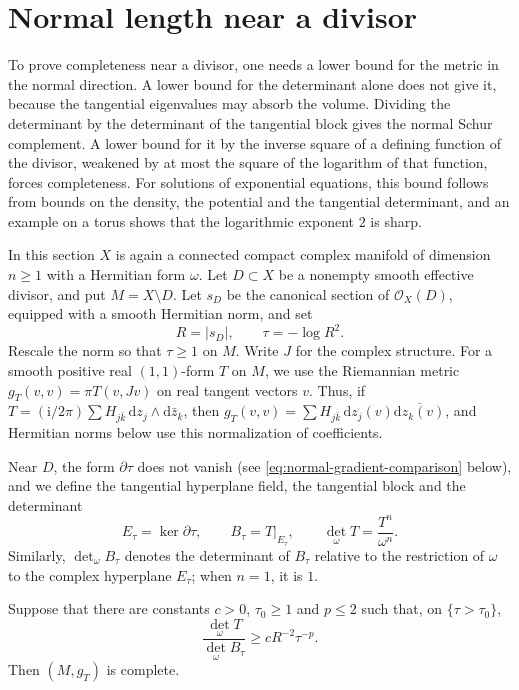 \section{Normal length near a divisor}
\label{sec:divisorial-normal-length}

To prove completeness near a divisor, one needs a lower bound for the metric in the normal direction. A lower bound for the determinant alone does not give it, because the tangential eigenvalues may absorb the volume. Dividing the determinant by the determinant of the tangential block gives the normal Schur complement. A lower bound for it by the inverse square of a defining function of the divisor, weakened by at most the square of the logarithm of that function, forces completeness. For solutions of exponential equations, this bound follows from bounds on the density, the potential and the tangential determinant, and an example on a torus shows that the logarithmic exponent $2$ is sharp.

In this section $X$ is again a connected compact complex manifold of dimension $n\geq1$ with a Hermitian form $\omega$. Let $D\subset X$ be a nonempty smooth effective divisor, and put $M=X\setminus D$. Let $s_D$ be the canonical section of $\mathcal O_X(D)$, equipped with a smooth Hermitian norm, and set
\[
 R=|s_D|,\qquad \tau=-\log R^2.
\]
Rescale the norm so that $\tau\geq1$ on $M$. Write $J$ for the complex structure. For a smooth positive real $(1,1)$-form $T$ on $M$, we use the Riemannian metric $g_T(v,v)=\pi T(v,Jv)$ on real tangent vectors $v$. Thus, if $T=(\mathrm{i}/2\pi)\sum H_{j\bar k}\,\mathrm{d}z_j\wedge\mathrm{d}\bar z_k$, then $g_T(v,v)=\sum H_{j\bar k}\,\mathrm{d}z_j(v)\overline{\mathrm{d}z_k(v)}$, and Hermitian norms below use this normalization of coefficients.

Near $D$, the form $\partial\tau$ does not vanish (see \eqref{eq:normal-gradient-comparison} below), and we define the tangential hyperplane field, the tangential block and the determinant
\[
 E_\tau=\ker\partial\tau,\qquad B_\tau=T|_{E_\tau},\qquad
 \det_\omega T=\frac{T^n}{\omega^n}.
\]
Similarly, $\det_\omega B_\tau$ denotes the determinant of $B_\tau$ relative to the restriction of $\omega$ to the complex hyperplane $E_\tau$; when $n=1$, it is $1$.

\begin{proposition}\label{prop:divisorial-normal-length}
Suppose that there are constants $c>0$, $\tau_0\geq1$ and $p\leq2$ such that, on $\{\tau>\tau_0\}$,
\begin{equation}\label{eq:normal-determinant-ratio}
 \frac{\det_\omega T}{\det_\omega B_\tau}
 \geq cR^{-2}\tau^{-p}.
\end{equation}
Then $(M,g_T)$ is complete.
\end{proposition}

